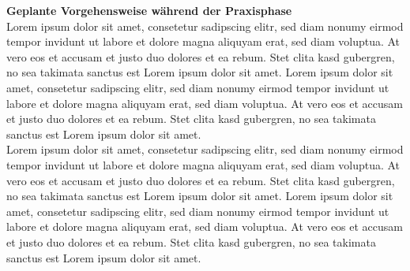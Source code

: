 \textbf{Geplante Vorgehensweise während der Praxisphase}\\
Lorem ipsum dolor sit amet, consetetur sadipscing elitr, sed diam nonumy eirmod tempor invidunt ut labore et dolore magna aliquyam erat, sed diam voluptua. At vero eos et accusam et justo duo dolores et ea rebum. Stet clita kasd gubergren, no sea takimata sanctus est Lorem ipsum dolor sit amet. Lorem ipsum dolor sit amet, consetetur sadipscing elitr, sed diam nonumy eirmod tempor invidunt ut labore et dolore magna aliquyam erat, sed diam voluptua. At vero eos et accusam et justo duo dolores et ea rebum. Stet clita kasd gubergren, no sea takimata sanctus est Lorem ipsum dolor sit amet.\\

Lorem ipsum dolor sit amet, consetetur sadipscing elitr, sed diam nonumy eirmod tempor invidunt ut labore et dolore magna aliquyam erat, sed diam voluptua. At vero eos et accusam et justo duo dolores et ea rebum. Stet clita kasd gubergren, no sea takimata sanctus est Lorem ipsum dolor sit amet. Lorem ipsum dolor sit amet, consetetur sadipscing elitr, sed diam nonumy eirmod tempor invidunt ut labore et dolore magna aliquyam erat, sed diam voluptua. At vero eos et accusam et justo duo dolores et ea rebum. Stet clita kasd gubergren, no sea takimata sanctus est Lorem ipsum dolor sit amet.\\


